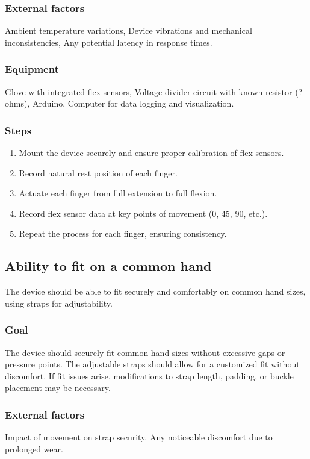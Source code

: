 \documentclass{article}
\begin{document}
\subsubsection{External factors} Ambient temperature variations, Device vibrations and mechanical inconsistencies, Any potential latency in response times.

\subsubsection{Equipment} Glove with integrated flex sensors, Voltage divider circuit with known resistor (? ohms), Arduino, Computer for data logging and visualization.

\subsubsection{Steps}
\begin{enumerate}
    \item Mount the device securely and ensure proper calibration of flex sensors.
    \item Record natural rest position of each finger.
    \item Actuate each finger from full extension to full flexion.
    \item Record flex sensor data at key points of movement (0, 45, 90, etc.).
    \item Repeat the process for each finger, ensuring consistency.
\end{enumerate}

\subsection{Ability to fit on a common hand}
The device should be able to fit securely and comfortably on common hand sizes, using straps for adjustability.

\subsubsection{Goal} The device should securely fit common hand sizes without excessive gaps or pressure points. The adjustable straps should allow for a customized fit without discomfort. If fit issues arise, modifications to strap length, padding, or buckle placement may be necessary.

\subsubsection{External factors} Impact of movement on strap security. Any noticeable discomfort due to prolonged wear.
\end{document}
